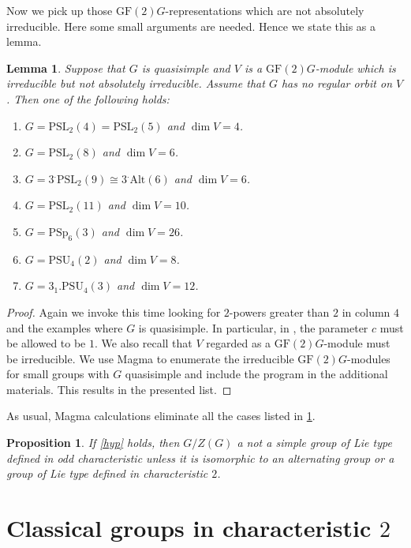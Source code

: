 \documentclass[12pt]{amsart}
\newtheorem{proposition}[theorem]{Proposition}
\newtheorem{lemma}[theorem]{Lemma}
\theoremstyle{remark}
\theoremstyle{notation}
\theoremstyle{definition}
\newcommand{\GF}{\mathrm{GF}}
\newcommand{\PSU}{\mathrm{PSU}}
\newcommand{\0}{\emptyset}
\newcommand{\PSL}{\mathrm{PSL}}
\newcommand{\PSp}{\mathrm{PSp}}
\newcommand{\Alt}{\mathrm{Alt}}
\begin{document}
Now we pick up those $\GF(2)G$-representations which are not absolutely irreducible. Here some small arguments are needed. Hence  we state this as a lemma.
\begin{lemma}\label{lem:not abs red}
Suppose that $ G $ is quasisimple and  $V$ is a  $\GF(2)G$-module which is irreducible but not absolutely irreducible.  Assume that $G$ has no regular orbit on  $V$. Then one of the following holds:

\begin{enumerate}\item   $G=\PSL_2(4)=\PSL_2(5) $ and $\dim V=4$.

\item $G= \PSL_2(8)$ and     $\dim V= 6$.
\item   $G= 3^{.} \PSL_2(9)\cong 3^. \Alt(6)$  and $\dim V=6$.
\item $G=\PSL_2(11)$ and $\dim V=10$.
\item  $G=\PSp_6(3)$ and $\dim V= 26$.
\item  $G=\PSU_4(2)$ and $\dim V=8$.
\item  $G=3_1.\PSU_4(3) $ and $\dim V= 12$.
\end{enumerate}
\end{lemma}

\begin{proof}
Again we invoke \cite[Table 1.2]{Lee1} this time looking for $2$-powers greater than $2$ in column $4$ and the examples where $G$ is quasisimple. In particular, in \cite[Table 1.2]{Lee1},   the parameter $c$ must be allowed to be $1$. We also recall that $V$ regarded as a $\GF(2)G$-module   must be irreducible. We use {\sc Magma} to enumerate the irreducible $\GF(2)G$-modules for small groups with $ G $ quasisimple and include the program in the additional materials. This results in the presented list.
\end{proof}

As usual, {\sc Magma} calculations eliminate all the cases listed in \cref{lem:not abs red}.


\begin{proposition}\label{prop:no Lie Odd} If \cref{hyp} holds, then $G/Z(G)$ a not a simple group of Lie type   defined in odd characteristic unless it is isomorphic to an alternating group or a group of Lie type defined in characteristic $2$.
\end{proposition}


\section{Classical groups in characteristic $2$}\label{class char 2}
\end{document}
